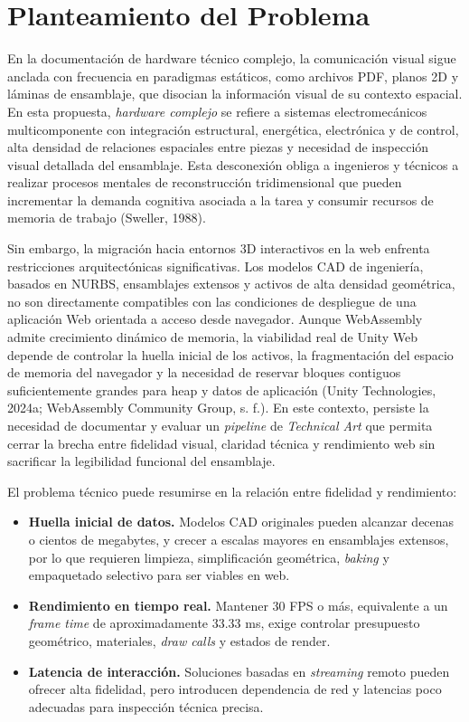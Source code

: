 \section{Planteamiento del Problema}

En la documentaci\'on de hardware t\'ecnico complejo, la comunicaci\'on visual sigue anclada con frecuencia en paradigmas est\'aticos, como archivos PDF, planos 2D y l\'aminas de ensamblaje, que disocian la informaci\'on visual de su contexto espacial. En esta propuesta, \textit{hardware complejo} se refiere a sistemas electromec\'anicos multicomponente con integraci\'on estructural, energ\'etica, electr\'onica y de control, alta densidad de relaciones espaciales entre piezas y necesidad de inspecci\'on visual detallada del ensamblaje. Esta desconexi\'on obliga a ingenieros y t\'ecnicos a realizar procesos mentales de reconstrucci\'on tridimensional que pueden incrementar la demanda cognitiva asociada a la tarea y consumir recursos de memoria de trabajo (Sweller, 1988).

Sin embargo, la migraci\'on hacia entornos 3D interactivos en la web enfrenta restricciones arquitect\'onicas significativas. Los modelos CAD de ingenier\'ia, basados en NURBS, ensamblajes extensos y activos de alta densidad geom\'etrica, no son directamente compatibles con las condiciones de despliegue de una aplicaci\'on Web orientada a acceso desde navegador. Aunque WebAssembly admite crecimiento din\'amico de memoria, la viabilidad real de Unity Web depende de controlar la huella inicial de los activos, la fragmentaci\'on del espacio de memoria del navegador y la necesidad de reservar bloques contiguos suficientemente grandes para heap y datos de aplicaci\'on (Unity Technologies, 2024a; WebAssembly Community Group, s. f.). En este contexto, persiste la necesidad de documentar y evaluar un \textit{pipeline} de \textit{Technical Art} que permita cerrar la brecha entre fidelidad visual, claridad t\'ecnica y rendimiento web sin sacrificar la legibilidad funcional del ensamblaje.

El problema t\'ecnico puede resumirse en la relaci\'on entre fidelidad y rendimiento:
\begin{itemize}
    \item \textbf{Huella inicial de datos.} Modelos CAD originales pueden alcanzar decenas o cientos de megabytes, y crecer a escalas mayores en ensamblajes extensos, por lo que requieren limpieza, simplificaci\'on geom\'etrica, \textit{baking} y empaquetado selectivo para ser viables en web.
    \item \textbf{Rendimiento en tiempo real.} Mantener 30 FPS o m\'as, equivalente a un \textit{frame time} de aproximadamente 33.33 ms, exige controlar presupuesto geom\'etrico, materiales, \textit{draw calls} y estados de render.
    \item \textbf{Latencia de interacci\'on.} Soluciones basadas en \textit{streaming} remoto pueden ofrecer alta fidelidad, pero introducen dependencia de red y latencias poco adecuadas para inspecci\'on t\'ecnica precisa.
\end{itemize}

